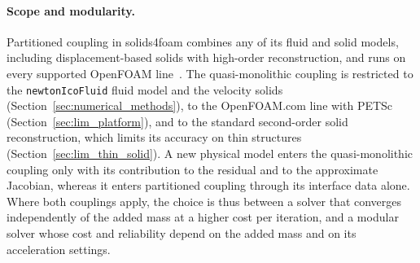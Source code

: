 \paragraph{Scope and modularity.}
Partitioned coupling in solids4foam combines any of its fluid and solid models, including displacement-based solids with high-order reconstruction, and runs on every supported OpenFOAM line~\citep{Tukovic2018, Cardiff2025}.
The quasi-monolithic coupling is restricted to the \texttt{newtonIcoFluid} fluid model and the velocity solids (Section~\ref{sec:numerical_methods}), to the OpenFOAM.com line with PETSc (Section~\ref{sec:lim_platform}), and to the standard second-order solid reconstruction, which limits its accuracy on thin structures (Section~\ref{sec:lim_thin_solid}).
A new physical model enters the quasi-monolithic coupling only with its contribution to the residual and to the approximate Jacobian, whereas it enters partitioned coupling through its interface data alone.
Where both couplings apply, the choice is thus between a solver that converges independently of the added mass at a higher cost per iteration, and a modular solver whose cost and reliability depend on the added mass and on its acceleration settings.
